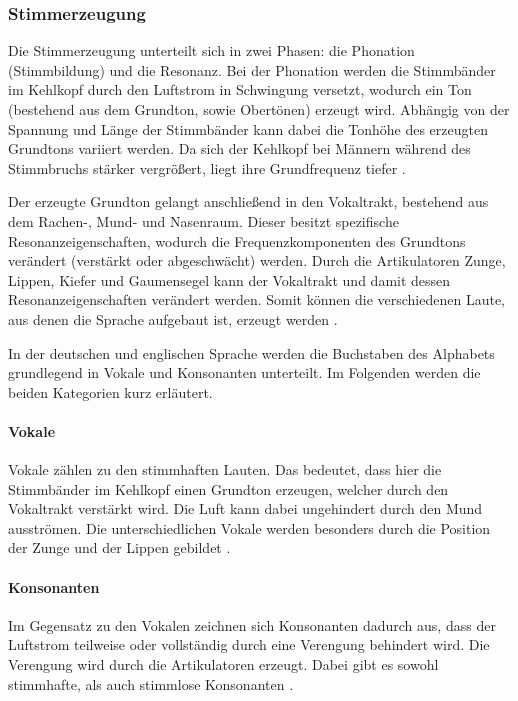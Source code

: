 \subsubsection{Stimmerzeugung}
Die Stimmerzeugung unterteilt sich in zwei Phasen: die Phonation (Stimmbildung) und die Resonanz.
Bei der Phonation werden die Stimmbänder im Kehlkopf durch den Luftstrom in Schwingung versetzt, wodurch ein Ton (bestehend aus dem Grundton, sowie Obertönen) erzeugt wird.
Abhängig von der Spannung und Länge der Stimmbänder kann dabei die Tonhöhe des erzeugten Grundtons variiert werden.
Da sich der Kehlkopf bei Männern während des Stimmbruchs stärker vergrößert, liegt ihre Grundfrequenz tiefer \autocite[vgl.][S. 278-279]{clauss_humanbiologie_2018}.

Der erzeugte Grundton gelangt anschließend in den Vokaltrakt, bestehend aus dem Rachen-, Mund- und Nasenraum.
Dieser besitzt spezifische Resonanzeigenschaften, wodurch die Frequenzkomponenten des Grundtons verändert (verstärkt oder abgeschwächt) werden.
Durch die Artikulatoren Zunge, Lippen, Kiefer und Gaumensegel kann der Vokaltrakt und damit dessen Resonanzeigenschaften verändert werden.
Somit können die verschiedenen Laute, aus denen die Sprache aufgebaut ist, erzeugt werden \autocite[vgl.][S. 13-14]{pfister_sprachverarbeitung_2017}.

In der deutschen und englischen Sprache werden die Buchstaben des Alphabets grundlegend in Vokale und Konsonanten unterteilt.
Im Folgenden werden die beiden Kategorien kurz erläutert.

\paragraph{Vokale}
Vokale zählen zu den stimmhaften Lauten.
Das bedeutet, dass hier die Stimmbänder im Kehlkopf einen Grundton erzeugen, welcher durch den Vokaltrakt verstärkt wird.
Die Luft kann dabei ungehindert durch den Mund ausströmen.
Die unterschiedlichen Vokale werden besonders durch die Position der Zunge und der Lippen gebildet \autocite[vgl.][S. 14]{pfister_sprachverarbeitung_2017}.

\paragraph{Konsonanten}
Im Gegensatz zu den Vokalen zeichnen sich Konsonanten dadurch aus, dass der Luftstrom teilweise oder vollständig durch eine Verengung behindert wird.
Die Verengung wird durch die Artikulatoren erzeugt.
Dabei gibt es sowohl stimmhafte, als auch stimmlose Konsonanten \autocite[vgl.][S. 15]{pfister_sprachverarbeitung_2017}.

